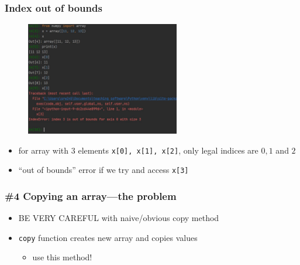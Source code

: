 \documentclass[14pt]{beamer}
\newcommand\red[1]{{\color{red} #1}}
\begin{document}
\begin{frame}[fragile]

\frametitle{Index out of bounds}

\begin{figure}[ht]
	\centering
	\includegraphics[width=0.6\textwidth]{figures/LLp50PyCharm}
\end{figure}
\vspace*{-5mm}
\begin{itemize}
	\item for array with 3 elements \texttt{x[0], x[1], x[2]}, only legal indices are $0,1$ and $2$
	\item ``out of bounds'' error if we try and access \texttt{x[3]}
\end{itemize}

\end{frame}


\begin{frame}[fragile]

\frametitle{\#4 Copying an array---the problem}

\begin{itemize}
	\item \red{BE VERY CAREFUL} with naive/obvious copy method
	\item \texttt{copy} function creates new array and copies values
	\begin{itemize}
		\item use this method!
	\end{itemize}
\end{itemize}

\end{frame}

\end{document}

